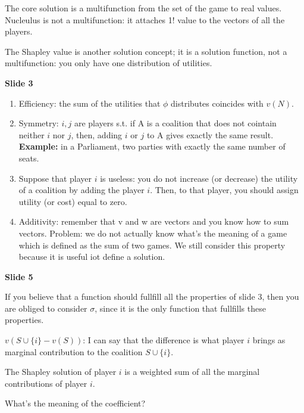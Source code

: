 \documentclass[pt11,a4paper,twoside,reqno,openright]{paper}
\begin{document}

\noindent The core solution is a multifunction from the set of the game to 
real values. Nucleulus is not a multifunction: it attaches 1! value to the 
vectors of all the players.

\noindent The Shapley value is another solution concept; it is a solution 
function, not a multifunction: you only have one distribution of utilities.

\bigskip
\noindent \textbf{Slide 3}

\begin{enumerate}
	\item Efficiency: the sum of the utilities that $\phi$ distributes 
	coincides with $v(N)$.
	
	\item Symmetry: $i,j$ are players s.t. if A is a coalition that does not 
	cointain neither $i$ nor $j$, then, adding $i$ or $j$ to A gives exactly 
	the same result.
	\textbf{Example:} in a Parliament, two parties with exactly the same 
	number of seats.

	\item Suppose that player $i$ is useless: you do not increase (or decrease) 
	the utility of a coalition by adding the player $i$. Then, to that player, 
	you should assign utility (or cost) equal to zero.

	\item Additivity: remember that v and w are vectors and you know how to 
	sum vectors. Problem: we do not actually know what's the meaning of a game 
	which is defined as the sum of two games. We still consider this property 
	because it is useful iot define a solution.
\end{enumerate}

\bigskip
\noindent \textbf{Slide 5}

\noindent If you believe that a function should fullfill all the properties of 
slide 3, then you are obliged to consider $\sigma$, since it is the only 
function that fullfills these properties.

\noindent $v(S \cup \{i\} - v(S))$: I can say that the difference is what 
player $i$ brings as marginal contribution to the coalition $S \cup \{i\}$.

\noindent The Shapley solution of player $i$ is a weighted sum of all the 
marginal contributions of player $i$. 

\noindent What's the meaning of the coefficient? 
\end{document}

